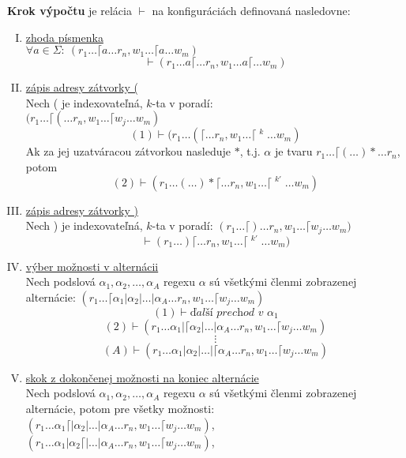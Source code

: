 \documentclass{svk_long_sk}
\begin{document}
\begin{definition}\label{dfkonfig}
\textbf{Krok výpočtu} je relácia $\vdash$ na konfiguráciách definovaná nasledovne:
\begin{enumerate}[I.]
\item \underline{zhoda písmenka}
\\ $\displaystyle \forall a \in \Sigma: ~(r_1 \dots \lceil a \dots r_n, w_1 \dots \lceil a \dots w_m)$ 
$$ \vdash (r_1 \dots a\lceil \dots r_n, w_1 \dots a \lceil \dots w_m)$$
\item \underline{zápis adresy zátvorky (}
\\ Nech ( je indexovateľná, $k$-ta v poradí: 
\\ $\displaystyle{ (r_1 \dots \lceil ( \dots r_n, w_1 \dots \lceil w_j \dots w_m)}$ 
$$ (1) \vdash (r_1 \dots (\lceil \dots r_n, w_1 \dots \lceil \mathop{w_j}^k \dots w_m)$$
Ak za jej uzatváracou zátvorkou nasleduje $*$, t.j. $\alpha$ je tvaru 
$\displaystyle r_1 \dots \lceil ( \dots ) * \dots r_n$, potom 
$$ (2) \vdash (r_1 \dots (\dots )* \lceil \dots r_n, w_1 \dots \lceil \mathop{\mathop{w_j}^k}^{k'} \dots w_m ) $$
\item \underline{zápis adresy zátvorky )}
\\ Nech ) je indexovateľná, $k$-ta v poradí: $\displaystyle (r_1 \dots \lceil ) \dots r_n, w_1 \dots \lceil w_j \dots w_m)$ 
$$ \vdash (r_1 \dots )\lceil \dots r_n, w_1 \dots \lceil \mathop{w_j}^{k'} \dots w_m)$$
\item \underline{výber možnosti v alternácii}
\\ Nech podslová $\alpha_1, \alpha_2,\dots,\alpha_A$ regexu $\alpha$ sú všetkými členmi zobrazenej alternácie: $(r_1 \dots \lceil \alpha_1 | \alpha_2 | \dots | \alpha_A \dots r_n, w_1\dots \lceil w_j \dots w_m)$
$$(1) \vdash \textit{ďalší prechod v }\alpha_1$$
$$(2) \vdash (r_1 \dots \alpha_1 | \lceil \alpha_2 | \dots | \alpha_A \dots r_n, w_1\dots \lceil w_j \dots w_m)$$
$$\vdots$$
$$(A) \vdash (r_1 \dots \alpha_1 | \alpha_2 | \dots | \lceil \alpha_A \dots r_n, w_1\dots \lceil w_j \dots w_m)$$
\item \underline{skok z dokončenej možnosti na koniec alternácie}
\\ Nech podslová $\alpha_1, \alpha_2,\dots,\alpha_A$ regexu $\alpha$ sú všetkými členmi zobrazenej alternácie, potom pre všetky možnosti:
\\ $(r_1 \dots \alpha_1 \lceil | \alpha_2 | \dots | \alpha_A \dots r_n, w_1\dots \lceil w_j \dots w_m)$,
\\ $(r_1 \dots \alpha_1 | \alpha_2 \lceil | \dots | \alpha_A \dots r_n, w_1\dots \lceil w_j \dots w_m)$,

\end{enumerate}
\end{definition}
\end{document}
